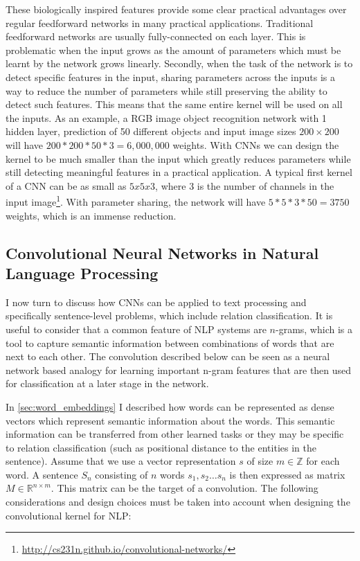 These biologically inspired features provide some clear practical advantages over regular feedforward networks in many practical applications. 
Traditional feedforward networks are usually fully-connected on each layer. This is problematic when the input grows as the amount of parameters which must be learnt by the network grows linearly. Secondly, when the task of the network is to detect specific features in the input, sharing parameters across the inputs is a way to reduce the number of parameters while still preserving the ability to detect such features. This means that the same entire kernel will be used on all the inputs. 
As an example, a RGB image object recognition network with 1 hidden layer, prediction of 50 different objects and input image sizes $200 \times 200$ will have $200 * 200 * 50 * 3 = 6,000,000$ weights.    
With CNNs we can design the kernel to be much smaller than the input which greatly reduces parameters while still detecting meaningful features in a practical application. A typical first kernel of a CNN can be as small as $5x5x3$, where 3 is the number of channels in the input image\footnote{\url{http://cs231n.github.io/convolutional-networks/}}. With parameter sharing, the network will have $5*5*3*50 = 3750$ weights, which is an immense reduction. 


\subsection{Convolutional Neural Networks in Natural Language Processing}

I now turn to discuss how CNNs can be applied to text processing and specifically sentence-level problems, which include relation classification. It is useful to consider that a common feature of NLP systems are $n$-grams, which is a tool to capture semantic information between combinations of words that are next to each other. The convolution described below can be seen as a neural network based analogy for learning important n-gram features that are then used for classification at a later stage in the network. 

In \autoref{sec:word_embeddings} I described how words can be represented as dense vectors which represent semantic information about the words. This semantic information can be transferred from other learned tasks or they may be specific to relation classification (such as positional distance to the entities in the sentence).
Assume that we use a vector representation $s$ of size $m \in \mathbb{Z}$ for each word.
A sentence $S_n$ consisting of $n$ words $s_1, s_2 \ldots s_n$ is then expressed as matrix $M \in \mathbb{R}^{n \times m}$. This matrix can be the target of a convolution. The following considerations and design choices must be taken into account when designing the convolutional kernel for NLP:

